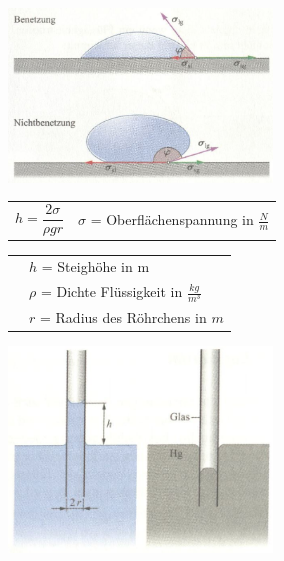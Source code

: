 		\begin{minipage}[t]{10cm}
			\vspace{-\ht\strutbox}\includegraphics[width=7cm]{./bilder/Grenzflaechenspannung.jpg}
		\end{minipage}
		\newline
		\newline
		\newline
		\begin{minipage}[t]{12cm}
				\renewcommand{\arraystretch}{2.5}
				\begin{tabular}{ p{4cm} p{7cm}}
					$h = \dfrac{2 \sigma}{\rho gr}$	&	$\sigma$ = Oberflächenspannung in $\frac{N}{m}$\\
				\end{tabular}
				\renewcommand{\arraystretch}{1.5}
				\begin{tabular}{ p{4cm} p{7cm}}
					& $h$ = Steighöhe in m\\
					& $\rho$ = Dichte Flüssigkeit in $\frac{kg}{m^3}$\\
					& $r$ = Radius des Röhrchens in $m$\\
				\end{tabular}
				\renewcommand{\arraystretch}{1}
		\end{minipage}
		\begin{minipage}[t]{10cm}
			\vspace{-\ht\strutbox}\includegraphics[width=7cm]{./bilder/Kapillaritaet.jpg}
		\end{minipage}
	
